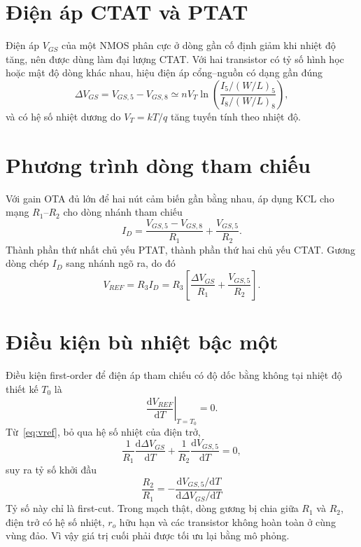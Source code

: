 \documentclass[11pt,a4paper]{report}
\newcommand{\dd}{\mathrm d}
\begin{document}
\section{Điện áp CTAT và PTAT}
Điện áp $V_{GS}$ của một NMOS phân cực ở dòng gần cố định giảm khi nhiệt độ
tăng, nên được dùng làm đại lượng CTAT. Với hai transistor có tỷ số hình học
hoặc mật độ dòng khác nhau, hiệu điện áp cổng--nguồn có dạng gần đúng
\begin{equation}
\Delta V_{GS}=V_{GS,5}-V_{GS,8}
\simeq nV_T\ln\!\left(
\frac{I_5/(W/L)_5}{I_8/(W/L)_8}
\right),
\label{eq:delta-vgs}
\end{equation}
và có hệ số nhiệt dương do $V_T=kT/q$ tăng tuyến tính theo nhiệt độ.

\section{Phương trình dòng tham chiếu}
Với gain OTA đủ lớn để hai nút cảm biến gần bằng nhau, áp dụng KCL cho mạng
$R_1$--$R_2$ cho dòng nhánh tham chiếu
\begin{equation}
I_D=\frac{V_{GS,5}-V_{GS,8}}{R_1}
   +\frac{V_{GS,5}}{R_2}.
\label{eq:iref}
\end{equation}
Thành phần thứ nhất chủ yếu PTAT, thành phần thứ hai chủ yếu CTAT. Gương dòng
chép $I_D$ sang nhánh ngõ ra, do đó
\begin{equation}
V_{REF}=R_3 I_D
=R_3\left[
\frac{\Delta V_{GS}}{R_1}+\frac{V_{GS,5}}{R_2}
\right].
\label{eq:vref}
\end{equation}

\section{Điều kiện bù nhiệt bậc một}
Điều kiện first-order để điện áp tham chiếu có độ dốc bằng không tại nhiệt độ
thiết kế $T_0$ là
\begin{equation}
\left.\frac{\dd V_{REF}}{\dd T}\right|_{T=T_0}=0.
\end{equation}
Từ~\eqref{eq:vref}, bỏ qua hệ số nhiệt của điện trở,
\begin{equation}
\frac{1}{R_1}\frac{\dd\Delta V_{GS}}{\dd T}
+\frac{1}{R_2}\frac{\dd V_{GS,5}}{\dd T}=0,
\end{equation}
suy ra tỷ số khởi đầu
\begin{equation}
\boxed{
\frac{R_2}{R_1}
=-\frac{\dd V_{GS,5}/\dd T}
        {\dd\Delta V_{GS}/\dd T}}
\label{eq:r-ratio}
\end{equation}
Tỷ số này chỉ là first-cut. Trong mạch thật, dòng gương bị chia giữa $R_1$ và
$R_2$, điện trở có hệ số nhiệt, $r_o$ hữu hạn và các transistor không hoàn toàn
ở cùng vùng đảo. Vì vậy giá trị cuối phải được tối ưu lại bằng mô phỏng.
\end{document}
